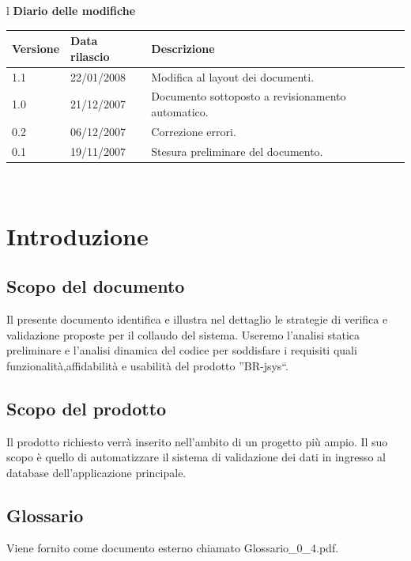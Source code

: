 \documentclass[11pt,titlepage,a4paper]{report}
\begin{document}
\begin{center}
\begin{table}[hbtp]
\large{
\begin{tabular}{l}
\Large{\textbf{\textsf{Diario delle modifiche}}} \\
\begin{tabular}{||p{2cm}||p{3.5cm}||p{6cm}||}
\hline
\textbf{Versione} & \textbf{Data rilascio} & \textbf{Descrizione} \\ \hline
1.1 & 22/01/2008 & Modifica al layout dei documenti.\\ \hline
1.0 & 21/12/2007 & Documento sottoposto a revisionamento automatico.\\ \hline
0.2 & 06/12/2007 & Correzione errori. \\ \hline
0.1 & 19/11/2007 & Stesura preliminare del documento. \\ \hline
\end{tabular} \\
\end{tabular}

}
\end{table}
\end{center}

\tableofcontents	%

\chapter{Introduzione}
\section{Scopo del documento}
Il presente documento identifica e illustra nel dettaglio le strategie di verifica e validazione proposte per il collaudo del sistema. Useremo l'analisi statica preliminare e l'analisi dinamica del codice per soddisfare i requisiti quali funzionalit\`a,affidabilit\`a e usabilit\`a del prodotto ''BR-jsys``.

\section{Scopo del prodotto}
Il prodotto richiesto verr\`a inserito nell'ambito di un progetto pi\`u ampio. Il suo scopo \`e quello di automatizzare il sistema di validazione dei dati in ingresso al database dell'applicazione principale.

\section{Glossario}
Viene fornito come documento esterno chiamato Glossario\_0\_4.pdf.
\end{document}
